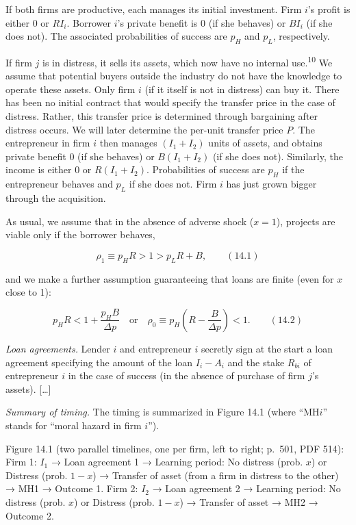 \documentclass[11pt,a4paper]{article}
\begin{document}
If both firms are productive, each manages its initial investment. Firm \(i\)'s profit is either 0
or \(RI_i\). Borrower \(i\)'s private benefit is 0 (if she behaves) or \(BI_i\) (if she does not).
The associated probabilities of success are \(p_H\) and \(p_L\), respectively.

If firm \(j\) is in distress, it sells its assets, which now have no internal
use.\textsuperscript{10} We assume that potential buyers outside the industry do not have the
knowledge to operate these assets. Only firm \(i\) (if it itself is not in distress) can buy it.
There has been no initial contract that would specify the transfer price in the case of distress.
Rather, this transfer price is determined through bargaining after distress occurs. We will later
determine the per-unit transfer price \(P\). The entrepreneur in firm \(i\) then manages
\((I_1 + I_2)\) units of assets, and obtains private benefit 0 (if she behaves) or \(B(I_1 + I_2)\)
(if she does not). Similarly, the income is either 0 or \(R(I_1 + I_2)\). Probabilities of success
are \(p_H\) if the entrepreneur behaves and \(p_L\) if she does not. Firm \(i\) has just grown
bigger through the acquisition.

As usual, we assume that in the absence of adverse shock (\(x = 1\)), projects are viable only if
the borrower behaves,

\[\rho_1 \equiv p_H R > 1 > p_L R + B, \qquad (14.1)\]

and we make a further assumption guaranteeing that loans are finite (even for \(x\) close to 1):

\[p_H R < 1 + \frac{p_H B}{\Delta p} \quad\text{or}\quad \rho_0 \equiv p_H\left(R - \frac{B}{\Delta p}\right) < 1. \qquad (14.2)\]

\emph{Loan agreements.} Lender \(i\) and entrepreneur \(i\) secretly sign at the start a loan
agreement specifying the amount of the loan \(I_i - A_i\) and the stake \(R_{bi}\) of entrepreneur
\(i\) in the case of success (in the absence of purchase of firm \(j\)'s assets). {[}\ldots{]}

\emph{Summary of timing.} The timing is summarized in Figure 14.1 (where ``MH\(i\)'' stands for
``moral hazard in firm \(i\)'').

Figure 14.1 (two parallel timelines, one per firm, left to right; p.~501, PDF 514): Firm 1: \(I_1\)
→ Loan agreement 1 → Learning period: No distress (prob. \(x\)) or Distress (prob. \(1 - x\)) →
Transfer of asset (from a firm in distress to the other) → MH1 → Outcome 1. Firm 2: \(I_2\) → Loan
agreement 2 → Learning period: No distress (prob. \(x\)) or Distress (prob. \(1 - x\)) → Transfer of
asset → MH2 → Outcome 2.
\end{document}
